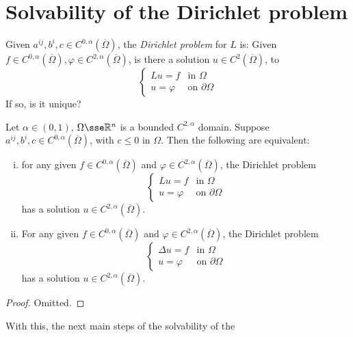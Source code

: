\documentclass{article}
\begin{document}
\lec

\section{Solvability of the Dirichlet problem}

Given \(a^{ij}, b^i, c \in C^{0, \alpha}(\overline\Omega)\), the \emph{Dirichlet problem} for \(L\) is: Given \(f \in C^{0, \alpha}(\overline\Omega), \varphi \in C^{2, \alpha}(\overline\Omega)\), is there a solution \(u \in C^2(\overline\Omega)\), to
\[\begin{cases}
    Lu = f &\text{in }\Omega \\
    u = \varphi &\text{on }\partial\Omega
\end{cases}\]
If so, is it unique?

\begin{theorem}
    Let \(\alpha \in (0, 1)\), \(\Omega \sse \R^n\) is a bounded \(C^{2, \alpha}\) domain. Suppose \(a^{ij}, b^i, c \in C^{0, \alpha}(\overline\Omega)\), with \(c \le 0\) in \(\Omega\). Then the following are equivalent:
    \begin{enumerate}[(i)]
        \item 
        for any given \(f \in C^{0, \alpha}(\overline\Omega)\) and \(\varphi \in C^{2, \alpha}(\overline\Omega)\), the Dirichlet problem
        \[\begin{cases}
            Lu = f &\text{in }\Omega \\
            u = \varphi &\text{on }\partial\Omega
        \end{cases}\]
        has a solution \(u \in C^{2, \alpha}(\overline\Omega)\).
        \item For any given \(f \in C^{0, \alpha}(\overline\Omega)\) and \(\varphi \in C^{2, \alpha}(\overline\Omega)\), the Dirichlet problem
        \[\begin{cases}
            \Delta u = f &\text{in }\Omega \\
            u = \varphi &\text{on }\partial\Omega
        \end{cases}\]
        has a solution \(u \in C^{2, \alpha}(\overline\Omega)\).
    \end{enumerate}
\end{theorem}

\begin{proof}
    Omitted.
\end{proof}

\lec

With this, the next main steps of the solvability of the 
\end{document}

